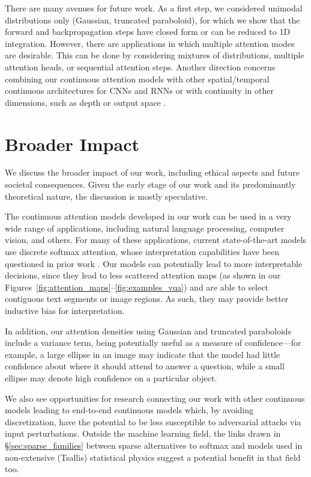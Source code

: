 \documentclass{article}
\begin{document}
There are many avenues for future work. 
As a first step, we  considered unimodal distributions only (Gaussian, truncated paraboloid), for which we show that the forward and backpropagation steps have closed form or can be reduced to 1D integration. However, there are applications in which  multiple attention modes are desirable. This can be done by considering mixtures of distributions,  multiple attention heads, or sequential attention steps. 
Another direction concerns combining our continuous attention models with 
other spatial/temporal continuous architectures for CNNs and RNNs \citep{wang2018deep,schutt2017schnet,funahashi1993approximation} or 
with continuity in other dimensions, such as depth \citep{chen2018neural} or output space \citep{kumar2018mises}.






\section*{Broader Impact}

We discuss the broader impact of our work, including ethical aspects and future societal consequences. Given the early stage of our work and its predominantly theoretical nature, the discussion is mostly speculative.

The continuous attention models developed in our work can be used in a very wide range of applications, including natural language processing, computer vision, and others. For many of these applications, current state-of-the-art models use discrete softmax attention, whose interpretation capabilities have been questioned in prior work \citep{jain2019attention,serrano2019attention,wiegreffe2019attention}. Our models can potentially lead to more interpretable decisions, since they lead to less scattered attention maps (as shown in our Figures~\ref{fig:attention_maps}--\ref{fig:examples_vqa}) and are able to select contiguous text segments or image regions. 
As such, they may provide better inductive bias for interpretation.


In addition, our attention densities using Gaussian and truncated paraboloids include a variance term, being potentially useful as a measure of confidence---for example, a large ellipse in an image may indicate that the model had little confidence about where it should attend to answer a question, while a small ellipse may denote high confidence on a particular object. 

We also see opportunities for research connecting our work with other continuous models \citep{wang2018deep,schutt2017schnet,chen2018neural} leading to end-to-end continuous models which, by avoiding discretization, have the potential to be less susceptible to adversarial attacks via input perturbations. 
Outside the machine learning field, the links drawn in \S\ref{sec:sparse_families} between sparse alternatives to softmax and models used in non-extensive (Tsallis) statistical physics suggest a potential benefit in that field too. 
\end{document}
